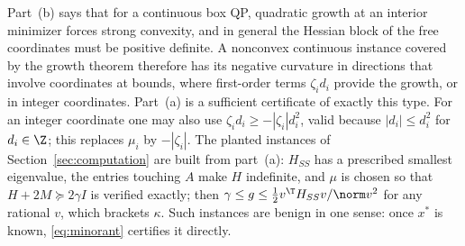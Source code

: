 \begin{remark}\label{rem:nonconvex}
Part~(b) says that for a continuous box QP, quadratic growth at an interior
minimizer forces strong convexity, and in general the Hessian block of the
free coordinates must be positive definite. A nonconvex continuous instance
covered by the growth theorem therefore has its negative curvature in
directions that involve coordinates at bounds, where first-order terms
$\zeta_id_i$ provide the growth, or in integer coordinates. Part~(a) is a
sufficient certificate of exactly this type. For an integer coordinate one
may also use $\zeta_id_i\ge-|\zeta_i|d_i^2$, valid because $|d_i|\le d_i^2$
for $d_i\in\Z$; this replaces $\mu_i$ by $-|\zeta_i|$. The planted instances of
Section~\ref{sec:computation} are built from part~(a): $H_{SS}$ has a
prescribed smallest eigenvalue, the entries touching $A$ make $H$ indefinite,
and $\mu$ is chosen so that $H+2M\succeq2\gamma I$ is verified exactly; then
$\gamma\le g\le\frac12v^{\T}H_{SS}v/\norm v^2$ for any rational $v$,
which brackets $\kappa$. Such instances are benign in one sense: once $x^*$
is known, \eqref{eq:minorant} certifies it directly.
\end{remark}

